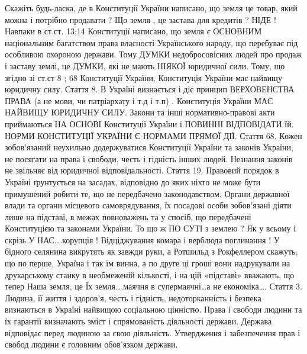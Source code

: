 \documentclass[a4paper,11pt]{extreport}
\begin{document}
\begin{itemize}
Скажіть будь-ласка, де в Конституції України написано, що земля це товар, який можна і потрібно продавати ? Що земля , це застава для кредитів ? НІДЕ ! Навпаки в ст.ст. 13;14 Конституції написано, що земля є ОСНОВНИМ національним багатством права власності Українського народу, що перебуває під особливою охороною держави. Тому ДУМКИ недобросовісних людей про продаж і заставу землі, це ДУМКИ, які не мають НІЯКОЇ юридичної сили. Тому, що згідно зі ст.ст 8 ; 68 Конституції України, Конституція України має найвищу юридичну силу. Стаття 8. В Україні визнається і діє принцип ВЕРХОВЕНСТВА ПРАВА (а не мови, чи патріархату і т.д і т.п) . Конституція України МАЄ НАЙВИЩУ ЮРИДИЧНУ СИЛУ. Закони та інші нормативно-правові акти приймаються НА ОСНОВІ Конституції України і ПОВИННІ ВІДПОВІДАТИ їй. НОРМИ КОНСТИТУЦІЇ УКРАЇНИ Є НОРМАМИ ПРЯМОЇ ДІЇ.
Стаття 68. Кожен зобов'язаний неухильно додержуватися Конституції України та законів України, не посягати на права і свободи, честь і гідність інших людей. Незнання законів не звільняє від юридичної відповідальності.
Стаття 19. Правовий порядок в Україні ґрунтується на засадах, відповідно до яких ніхто не може бути примушений робити те, що не передбачено законодавством.
Органи державної влади та органи місцевого самоврядування, їх посадові особи зобов'язані діяти лише на підставі, в межах повноважень та у спосіб, що передбачені Конституцією та законами України.
То що ж ПО СУТІ з землею ? Як у всьому і скрізь У НАС….корупція ! Відціджування комара і верблюда поглинання ! У бідного селянина викрутять як завжди руки, а Ротшильд з Рокфеллером скажуть, що по перше, Україна і так їм винна, а по друге ці гроші вони надрукували на друкарському станку в необмеженій кількості, і на цій «підставі» вважають, що тепер Наша земля, це Їх земля….маячня в супермаячні…а не економіка….
Стаття 3. Людина, її життя і здоров'я, честь і гідність, недоторканність і безпека визнаються в Україні найвищою соціальною цінністю.
Права і свободи людини та їх гарантії визначають зміст і спрямованість діяльності держави. Держава відповідає перед людиною за свою діяльність. Утвердження і забезпечення прав і свобод людини є головним обов'язком держави.


\end{itemize}
\end{document}
